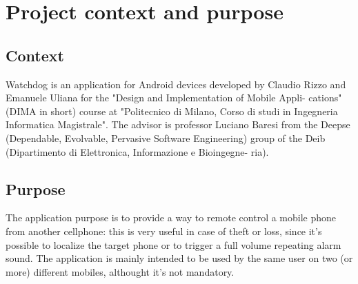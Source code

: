 \chapter{Project context and purpose }
\label{cap:Introduction} 

\section{Context}

Watchdog is an application for Android devices developed by Claudio Rizzo
and Emanuele Uliana for the "Design and Implementation of Mobile Appli-
cations" (DIMA in short) course at "Politecnico di Milano, Corso di studi in
Ingegneria Informatica Magistrale". The advisor is professor Luciano Baresi
from the Deepse (Dependable, Evolvable, Pervasive Software Engineering)
group of the Deib (Dipartimento di Elettronica, Informazione e Bioingegne-
ria).

\section{Purpose}

The application purpose is to provide a way to remote control a mobile phone
from another cellphone: this is very useful in case of theft or loss, since it’s
possible to localize the target phone or to trigger a full volume repeating
alarm sound. The application is mainly intended to be used by the same user
on two (or more) different mobiles, althought it’s not mandatory.


